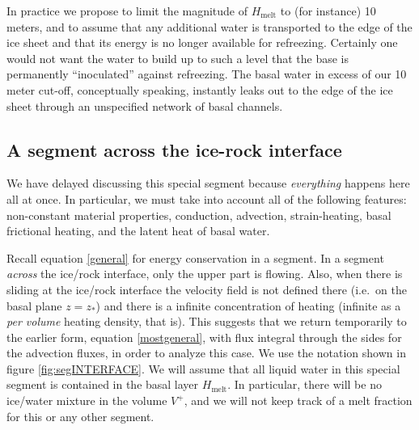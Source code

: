 \documentclass[12pt,final]{amsart}%
\theoremstyle{plain}
\theoremstyle{definition}
\theoremstyle{remark}
\begin{document}
In practice we propose to limit the magnitude of $H_{\text{melt}}$ to (for instance) 10 meters, and to assume that any additional water is transported to the edge of the ice sheet and that its energy is no longer available for refreezing.  Certainly one would not want the water to build up to such a level that the base is permanently ``inoculated'' against refreezing.  The basal water in excess of our 10 meter cut-off, conceptually speaking, instantly leaks out to the edge of the ice sheet through an unspecified network of basal channels.


\subsection*{A segment across the ice-rock interface} We have delayed discussing this special segment because \emph{everything} happens here all at once.  In particular, we must take into account all of the following features: non-constant material properties, conduction, advection, strain-heating, basal frictional heating, and the latent heat of basal water.

Recall equation \eqref{general} for energy conservation in a segment.  In a segment \emph{across} the ice/rock interface, only the upper part is flowing.  Also, when there is sliding at the ice/rock interface the velocity field is not defined there (i.e.~on the basal plane $z=z_\ast$) and there is a infinite concentration of heating (infinite as a \emph{per volume} heating density, that is).  This suggests that we return temporarily to the earlier form, equation \eqref{mostgeneral}, with flux integral through the sides for the advection fluxes, in order to analyze this case.  We use the notation shown in figure \ref{fig:segINTERFACE}.  We will assume that all liquid water in this special segment is contained in the basal layer $H_{\text{melt}}$.  In particular, there will be no ice/water mixture in the volume $V^+$, and we will not keep track of a melt fraction for this or any other segment.
\end{document}
